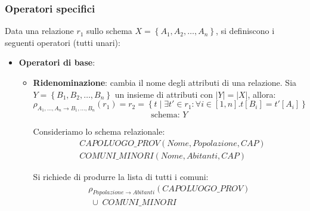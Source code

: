 \documentclass[a4paper,twoside]{article}
\begin{document}
\subsubsection{Operatori specifici}
Data una relazione \( r_1 \) sullo schema \( X = \left\{ A_1, A_2, \ldots, A_n \right\} \),
si definiscono i seguenti operatori (tutti unari):
\begin{itemize}
  \item \textbf{Operatori di base}:
    \begin{itemize}
      \item \textbf{Ridenominazione}: cambia il nome degli attributi di una relazione.
        Sia \( Y = \left\{ B_1, B_2, \ldots, B_n \right\} \) un insieme di attributi
        con \( |Y| = |X| \), allora:
        \[
          \rho_{A_1, \ldots, A_n \to B_1, \ldots, B_n}(r_1) = r_2
          = \left\{ t \mid \exists t' \in r_1: \forall i \in [1,n] . t[B_i] = t'[A_i] \right\}
        \] 
        \[
          \text{schema: } Y
        \] 

        \vspace{2em}
        \noindent
        \begin{example}
          Consideriamo lo schema relazionale:
          \[
            \begin{aligned}
              &CAPOLUOGO\_PROV(Nome, Popolazione, CAP)\\
              &COMUNI\_MINORI(Nome, Abitanti, CAP)
            \end{aligned}
          \]

          \vspace{1em}
          \noindent
          Si richiede di produrre la lista di tutti i comuni:
          \[
            \begin{aligned}
              \rho_{Popolazione \to Abitanti}(CAPOLUOGO\_PROV) \\
              \;\cup\; COMUNI\_MINORI
            \end{aligned}
          \] 
        \end{example}


\end{itemize}
\end{itemize}
\end{document}
